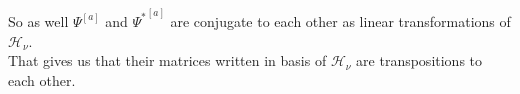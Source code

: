 \documentclass[a4paper, 12pt]{article}
\begin{document}
So as well $\Psi^{[a]}$ and ${\Psi^*}^{[a]}$ are conjugate to each other as linear transformations of
$\mathcal{H}_\nu$.\\ That gives us that their matrices written in basis of $\mathcal{H}_\nu$ are transpositions
to each other.
\end{document}
